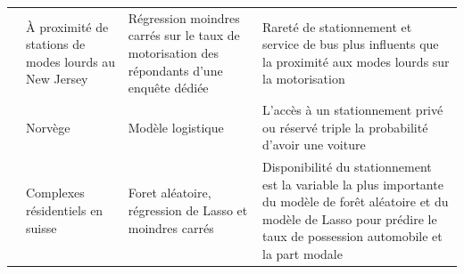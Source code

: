 \begin{landscape}
{\begin{longtable}{p{5cm}p{3cm}p{5cm}p{9cm}}
                    \textcite{chatman_does_2013}& À proximité de stations de modes lourds au New Jersey & Régression moindres carrés sur le taux de motorisation des répondants d'une enquête dédiée & Rareté de stationnement et service de bus plus influents que la proximité aux modes lourds sur la motorisation \\
                    \textcite{christiansen_household_2017} & Norvège & Modèle logistique & L'accès à un stationnement privé ou réservé triple la probabilité d'avoir une voiture \\ 
                    \textcite{stiebe_impacts_2025} & Complexes résidentiels en suisse & Foret aléatoire, régression de Lasso et moindres carrés & Disponibilité du stationnement est la variable la plus importante du modèle de forêt aléatoire et du modèle de Lasso pour prédire le taux de possession automobile et la part modale\\
                \end{longtable}

}
\end{landscape}
